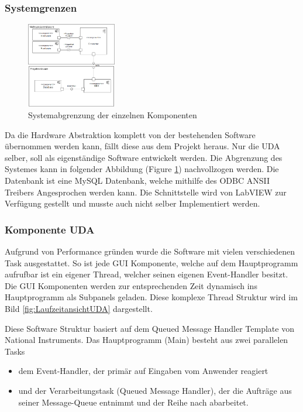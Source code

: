 \documentclass[10pt]{scrartcl}
\begin{document}
\subsubsection{Systemgrenzen}
\begin{figure}
	\begin{center}
		\includegraphics[width=0.35\textwidth]{Systemgrenzen}
		\caption{Systemabgrenzung der einzelnen Komponenten}
		\label{fig:SystemView}			
	\end{center}
\end{figure}
Da die Hardware Abstraktion komplett von der bestehenden Software übernommen werden kann, fällt diese aus dem Projekt heraus. Nur die UDA selber, soll als eigenständige Software entwickelt werden. Die Abgrenzung des Systemes kann in folgender Abbildung (Figure \ref{fig:SystemView}) nachvollzogen werden.
 Die Datenbank ist eine MySQL Datenbank, welche mithilfe des ODBC ANSII Treibers Angesprochen werden kann. Die Schnittstelle wird von \gls{LabVIEW} zur Verfügung gestellt und musste auch nicht selber Implementiert werden.
\subsubsection{Komponente UDA}
Aufgrund von Performance gründen wurde die Software mit vielen verschiedenen Task ausgestattet. So ist jede GUI Komponente, welche auf dem Hauptprogramm aufrufbar ist ein eigener Thread,  welcher seinen eigenen Event-Handler besitzt. Die GUI Komponenten werden zur entsprechenden Zeit dynamisch ins Hauptprogramm als Subpanels geladen. Diese komplexe Thread Struktur wird im Bild \ref{fig:LaufzeitansichtUDA} dargestellt.

Diese Software Struktur basiert auf dem Queued Message Handler Template von National Instruments.
Das Hauptprogramm (Main) besteht aus zwei parallelen Tasks
\begin{itemize}
	\item dem Event-Handler, der primär auf Eingaben vom Anwender reagiert
	\item und der Verarbeitungstask (Queued Message Handler), der die Aufträge aus seiner Message-Queue entnimmt und der Reihe nach abarbeitet.
\end{itemize}
\end{document}
